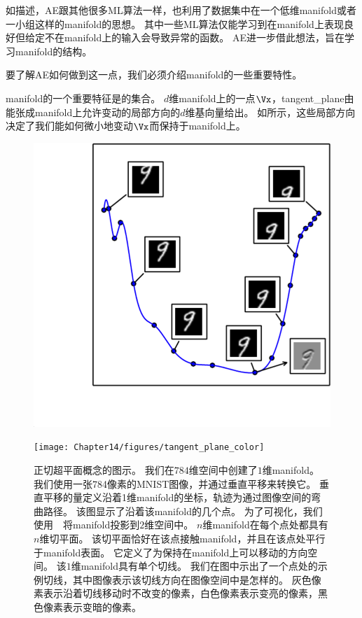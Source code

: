 如描述，\gls{AE}跟其他很多\gls{ML}算法一样，也利用了数据集中在一个低维\gls{manifold}或者一小组这样的\gls{manifold}的思想。
其中一些\gls{ML}算法仅能学习到在\gls{manifold}上表现良好但给定不在\gls{manifold}上的输入会导致异常的函数。
\gls{AE}进一步借此想法，旨在学习\gls{manifold}的结构。


要了解\gls{AE}如何做到这一点，我们必须介绍\gls{manifold}的一些重要特性。


\gls{manifold}的一个重要特征是的集合。
$d$维\gls{manifold}上的一点$\Vx$，\gls{tangent_plane}由能张成\gls{manifold}上允许变动的局部方向的$d$维基向量给出。
如所示，这些局部方向决定了我们能如何微小地变动$\Vx$而保持于\gls{manifold}上。

\begin{figure}[!htb]
\ifOpenSource
\centerline{\includegraphics[scale=0.5]{images/123.png}}
\else
\centerline{\texttt{[image: Chapter14/figures/tangent\_plane\_color]}}
\fi
\caption{正切超平面概念的图示。
我们在$784$维空间中创建了$1$维\gls{manifold}。
我们使用一张784像素的MNIST图像，并通过垂直平移来转换它。
垂直平移的量定义沿着1维\gls{manifold}的坐标，轨迹为通过图像空间的弯曲路径。
该图显示了沿着该\gls{manifold}的几个点。
为了可视化，我们使用~~将\gls{manifold}投影到$2$维空间中。
$n$维\gls{manifold}在每个点处都具有$n$维切平面。
该切平面恰好在该点接触\gls{manifold}，并且在该点处平行于\gls{manifold}表面。
它定义了为保持在\gls{manifold}上可以移动的方向空间。
该$1$维\gls{manifold}具有单个切线。
我们在图中示出了一个点处的示例切线，其中图像表示该切线方向在图像空间中是怎样的。
灰色像素表示沿着切线移动时不改变的像素，白色像素表示变亮的像素，黑色像素表示变暗的像素。
}
\label{fig:chap14_tangent_plane_color}
\end{figure}

